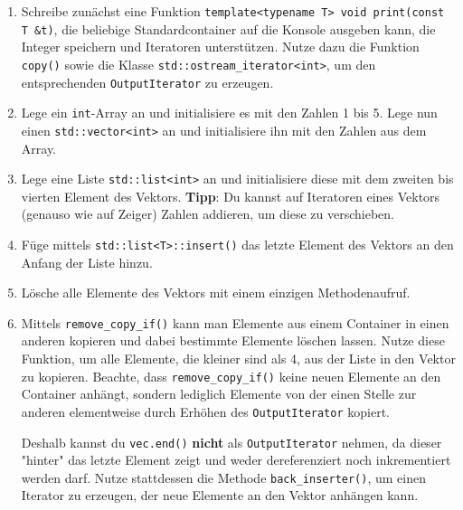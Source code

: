 \begin{enumerate}
\item 
Schreibe zunächst eine Funktion \lstinline{template<typename T> void print(const T &t)}, die beliebige Standardcontainer auf die Konsole ausgeben kann, die Integer speichern und Iteratoren unterstützen.
Nutze dazu die Funktion \lstinline{copy()} sowie die Klasse \lstinline{std::ostream_iterator<int>}, um den entsprechenden \lstinline{OutputIterator} zu erzeugen.

\item
Lege ein \lstinline{int}-Array an und initialisiere es mit den Zahlen 1 bis 5.
Lege nun einen \lstinline{std::vector<int>} an und initialisiere ihn mit den Zahlen aus dem Array.

\item
Lege eine Liste \lstinline{std::list<int>} an und initialisiere diese mit dem zweiten bis vierten Element des Vektors.
\textbf{Tipp}: Du kannst auf Iteratoren eines Vektors (genauso wie auf Zeiger) Zahlen addieren, um diese zu verschieben.

\item
Füge mittels \lstinline{std::list<T>::insert()} das letzte Element des Vektors an den Anfang der Liste hinzu.

\item
Lösche alle Elemente des Vektors mit einem einzigen Methodenaufruf.

\item
Mittels \lstinline{remove_copy_if()} kann man Elemente aus einem Container in einen anderen kopieren und dabei bestimmte Elemente löschen lassen.
Nutze diese Funktion, um alle Elemente, die kleiner sind als 4, aus der Liste in den Vektor zu kopieren.
Beachte, dass \lstinline{remove_copy_if()} keine neuen Elemente an den Container anhängt, sondern lediglich Elemente von der einen Stelle zur anderen elementweise durch Erhöhen des \lstinline{OutputIterator} kopiert.

Deshalb kannst du \lstinline{vec.end()} \textbf{nicht} als \lstinline{OutputIterator} nehmen, da dieser "{}hinter"{} das letzte Element zeigt und weder dereferenziert noch inkrementiert werden darf. Nutze stattdessen die Methode \lstinline{back_inserter()}, um einen Iterator zu erzeugen, der neue Elemente an den Vektor anhängen kann.
\end{enumerate}
